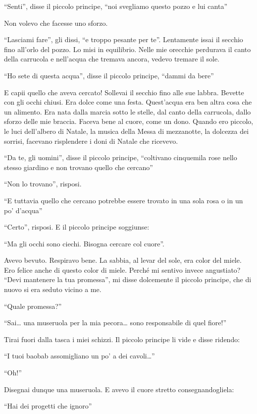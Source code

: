 \documentclass[11pt]{scrbook}
\begin{document}
``Senti'', disse il piccolo principe, ``noi svegliamo questo pozzo e lui canta''

Non volevo che facesse uno sforzo.

``Lasciami fare'', gli dissi, ``e troppo pesante per te''. Lentamente issai il secchio fino all'orlo del pozzo. Lo misi in equilibrio. Nelle mie orecchie perdurava il canto della carrucola e nell'acqua che tremava ancora, vedevo tremare il sole.

``Ho sete di questa acqua'', disse il piccolo principe, ``dammi da bere''

E capii quello che aveva cercato! Sollevai il secchio fino alle sue labbra. Bevette con gli occhi chiusi. Era dolce come una festa. Quest'acqua era ben altra cosa che un alimento. Era nata dalla marcia sotto le stelle, dal canto della carrucola, dallo sforzo delle mie braccia. Faceva bene al cuore, come un dono. Quando ero piccolo, le luci dell'albero di Natale, la musica della Messa di mezzanotte, la dolcezza dei sorrisi, facevano risplendere i doni di Natale che ricevevo.

``Da te, gli uomini'', disse il piccolo principe, ``coltivano cinquemila rose nello stesso giardino e non trovano quello che cercano''

``Non lo trovano'', risposi.

``E tuttavia quello che cercano potrebbe essere trovato in una sola rosa o in un po' d'acqua''

``Certo'', risposi. E il piccolo principe soggiunse:

``Ma gli occhi sono ciechi. Bisogna cercare col cuore''.

Avevo bevuto. Respiravo bene. La sabbia, al levar del sole, era color del miele. Ero felice anche di questo color di miele. Perché mi sentivo invece angustiato? ``Devi mantenere la tua promessa'', mi disse dolcemente il piccolo principe, che di nuovo si era seduto vicino a me.

``Quale promessa?''

``Sai\ldots{} una museruola per la mia pecora\ldots{} sono responsabile di quel fiore!''

Tirai fuori dalla tasca i miei schizzi. Il piccolo principe li vide e disse ridendo:

``I tuoi baobab assomigliano un po' a dei cavoli\ldots{}''

``Oh!''

Disegnai dunque una museruola. E avevo il cuore stretto consegnandogliela:

``Hai dei progetti che ignoro''
\end{document}
